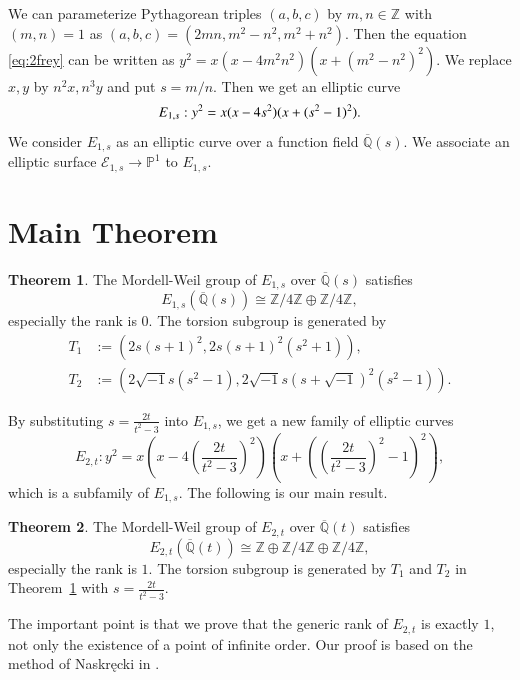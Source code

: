 \documentclass[a4paper]{jarticle} %
\theoremstyle{definition}
\newtheorem{thm}{Theorem}[section]
\theoremstyle{remark}
\begin{document}
We can parameterize Pythagorean triples $(a,b,c)$ by $m,n \in \mathbb{Z}$ with $(m,n)=1$ as $(a,b,c) = (2mn, m^{2} - n^{2}, m^{2} + n^{2})$.
Then the equation \eqref{eq:2frey} can be written as $y^{2} = x(x - 4m^2n^2)(x + (m^{2} - n^2)^{2})$.
We replace $x,y$ by $n^2x, n^3y$ and put $s = m/n$.
Then we get an elliptic curve
\begin{equation}
    \label{eq:E_{1,s}}
    E_{1,s}: y^{2} = x(x - 4s^{2})(x + (s^{2} - 1)^{2}).
\end{equation}
We consider $E_{1,s}$ as an elliptic curve over a function field $\overline{\mathbb{Q}}(s)$.
We associate an elliptic surface $\mathcal{E}_{1,s} \to \mathbb{P}^1$ to $E_{1,s}$.


\section{Main Theorem}

\begin{thm}
    \label{thm:E_{1,s}}
    The Mordell-Weil group of $E_{1,s}$ over $\overline{\mathbb{Q}}(s)$ satisfies
    \begin{equation*}
        E_{1,s}(\overline{\mathbb{Q}}(s)) \cong \mathbb{Z} / 4 \mathbb{Z} \oplus \mathbb{Z} / 4 \mathbb{Z},
    \end{equation*}
    especially the rank is $0$. The torsion subgroup is generated by
    \begin{align*}
        T_1 & := (2s(s+1)^2, 2s(s+1)^2(s^2+1)),                               \\
        T_2 & := (2 \sqrt{-1} s(s^2-1),2 \sqrt{-1} s(s+\sqrt{-1})^2(s^2-1)).
    \end{align*}
\end{thm}

By substituting $s = \frac{2t}{t^{2} - 3}$ into $E_{1,s}$, we get a new family of elliptic curves
\begin{equation*}
    E_{2,t}: y^{2} = x \left(x - 4 \left(\frac{2t}{t^{2} - 3} \right)^{2} \right) \left(x + \left(\left(\frac{2t}{t^{2} - 3} \right)^{2} - 1 \right)^{2} \right),
\end{equation*}
which is a subfamily of $E_{1,s}$.
The following is our main result.
\begin{thm}
    \label{thm:E_{2,t}}
    The Mordell-Weil group of $E_{2,t}$ over $\overline{\mathbb{Q}}(t)$ satisfies
    \begin{equation*}
        E_{2,t}(\overline{\mathbb{Q}}(t)) \cong \mathbb{Z} \oplus \mathbb{Z} / 4 \mathbb{Z} \oplus \mathbb{Z} / 4 \mathbb{Z},
    \end{equation*}
    especially the rank is $1$.
    The torsion subgroup is generated by $T_1$ and $T_2$ in Theorem~\ref{thm:E_{1,s}} with $s = \frac{2t}{t^{2} - 3}$.
\end{thm}
The important point is that we prove that the generic rank of $E_{2,t}$ is exactly $1$, not only the existence of a point of infinite order.
Our proof is based on the method of Naskręcki in \cite{ref:naskrecki2013}.
\end{document}

